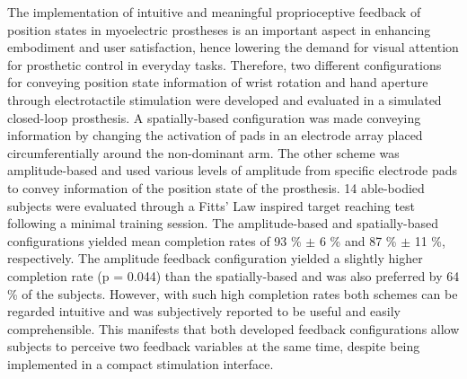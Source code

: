 The implementation of intuitive and meaningful proprioceptive feedback of position states in myoelectric prostheses is an important aspect in enhancing embodiment and user satisfaction, hence lowering the demand for visual attention for prosthetic control in everyday tasks. Therefore, two different configurations for conveying position state information of wrist rotation and hand aperture through electrotactile stimulation were developed and evaluated in a simulated closed-loop prosthesis. A spatially-based configuration was made conveying information by changing the activation of pads in an electrode array placed circumferentially around the non-dominant arm. The other scheme was amplitude-based and used various levels of amplitude from specific electrode pads to convey information of the position state of the prosthesis. 14 able-bodied subjects were evaluated through a Fitts' Law inspired target reaching test following a minimal training session.
The amplitude-based and spatially-based configurations yielded mean completion rates of 93 \% $\boldsymbol{\pm}$ 6 \% and 87 \% $\boldsymbol{\pm}$ 11 \%, respectively. The amplitude feedback configuration yielded a slightly higher completion rate (p = 0.044) than the spatially-based and was also preferred by 64 \% of the subjects. However, with such high completion rates both schemes can be regarded intuitive and was subjectively reported to be useful and easily comprehensible. This manifests that both developed feedback configurations allow subjects to perceive two feedback variables at the same time, despite being implemented in a compact stimulation interface. 
 
 
 
